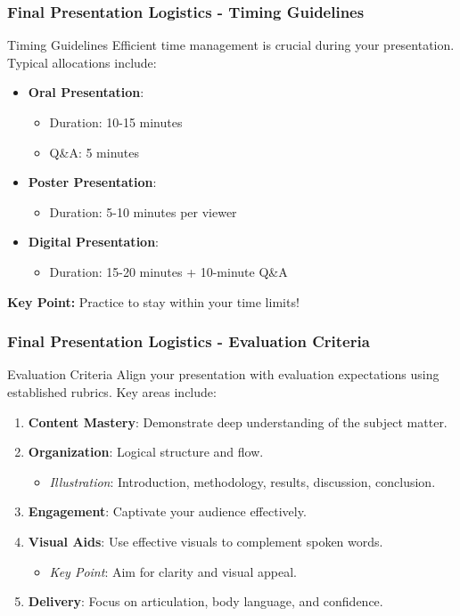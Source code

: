 \documentclass{beamer}
\begin{document}
\begin{frame}[fragile]
    \frametitle{Final Presentation Logistics - Timing Guidelines}
    \begin{block}{Timing Guidelines}
        Efficient time management is crucial during your presentation. Typical allocations include:
    \end{block}
    \begin{itemize}
        \item \textbf{Oral Presentation}: 
            \begin{itemize}
                \item Duration: 10-15 minutes
                \item Q\&A: 5 minutes
            \end{itemize}
        \item \textbf{Poster Presentation}: 
            \begin{itemize}
                \item Duration: 5-10 minutes per viewer
            \end{itemize}
        \item \textbf{Digital Presentation}: 
            \begin{itemize}
                \item Duration: 15-20 minutes + 10-minute Q\&A
            \end{itemize}
    \end{itemize}
    \textbf{Key Point:} Practice to stay within your time limits!
\end{frame}

\begin{frame}[fragile]
    \frametitle{Final Presentation Logistics - Evaluation Criteria}
    \begin{block}{Evaluation Criteria}
        Align your presentation with evaluation expectations using established rubrics. Key areas include:
    \end{block}
    \begin{enumerate}
        \item \textbf{Content Mastery}: Demonstrate deep understanding of the subject matter.
        \item \textbf{Organization}: Logical structure and flow.
            \begin{itemize}
                \item \textit{Illustration}: Introduction, methodology, results, discussion, conclusion.
            \end{itemize}
        \item \textbf{Engagement}: Captivate your audience effectively.
        \item \textbf{Visual Aids}: Use effective visuals to complement spoken words.
            \begin{itemize}
                \item \textit{Key Point}: Aim for clarity and visual appeal.
            \end{itemize}
        \item \textbf{Delivery}: Focus on articulation, body language, and confidence.
    \end{enumerate}
\end{frame}
\end{document}

